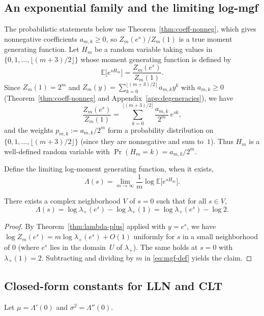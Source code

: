 \subsection{An exponential family and the limiting log-mgf}

The probabilistic statements below use Theorem~\ref{thm:coeff-nonneg}, which gives nonnegative coefficients $a_{m,k}\ge0$, so $Z_m(e^s)/Z_m(1)$ is a true moment generating function.
Let $H_m$ be a random variable taking values in $\{0,1,\dots,\lfloor (m+3)/2\rfloor\}$ whose moment generating function is defined by
\begin{equation}\label{eq:mgf-def}
\mathbb{E}\bigl[e^{sH_m}\bigr]=\frac{Z_m(e^s)}{Z_m(1)}.
\end{equation}
Since $Z_m(1)=2^m$ and $Z_m(y)=\sum_{k=0}^{\lfloor (m+3)/2\rfloor} a_{m,k}y^k$ with $a_{m,k}\ge 0$ (Theorem~\ref{thm:coeff-nonneg} and Appendix~\ref{app:degeneracies}), we have
\[
\frac{Z_m(e^s)}{Z_m(1)}=\sum_{k=0}^{\lfloor (m+3)/2\rfloor} \frac{a_{m,k}}{2^m}\,e^{sk},
\]
and the weights $p_{m,k}:=a_{m,k}/2^m$ form a probability distribution on $\{0,1,\dots,\lfloor (m+3)/2\rfloor\}$ (since they are nonnegative and sum to~$1$).
Thus $H_m$ is a well-defined random variable with $\Pr(H_m=k)=a_{m,k}/2^m$.

Define the limiting log-moment generating function, when it exists,
\[
\Lambda(s)=\lim_{m\to\infty}\frac{1}{m}\log \mathbb{E}\bigl[e^{sH_m}\bigr].
\]

\begin{theorem}\label{thm:lambda-mgf}
There exists a complex neighborhood $V$ of $s=0$ such that for all $s\in V$,
\[
\Lambda(s)=\log \lambda_+(e^s)-\log \lambda_+(1)=\log \lambda_+(e^s)-\log 2.
\]
\end{theorem}

\begin{proof}
By Theorem~\ref{thm:lambda-plus} applied with $y=e^s$, we have
$\log Z_m(e^s)=m\log \lambda_+(e^s)+O(1)$ uniformly for $s$ in a small neighborhood of $0$ (where $e^s$ lies in the domain~$U$ of $\lambda_+$).
The same holds at $s=0$ with $\lambda_+(1)=2$.
Subtracting and dividing by $m$ in \eqref{eq:mgf-def} yields the claim.
\end{proof}

\subsection{Closed-form constants for LLN and CLT}

Let $\mu=\Lambda'(0)$ and $\sigma^2=\Lambda''(0)$.

